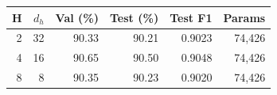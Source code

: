 \begin{tabular}{rrrrrr}
\toprule
H & $d_h$ & Val (\%) & Test (\%) & Test F1 & Params\\
\midrule
2 & 32 & 90.33 & 90.21 & 0.9023 & 74,426\\
4 & 16 & 90.65 & 90.50 & 0.9048 & 74,426\\
8 & 8 & 90.35 & 90.23 & 0.9020 & 74,426\\
\bottomrule
\end{tabular}
